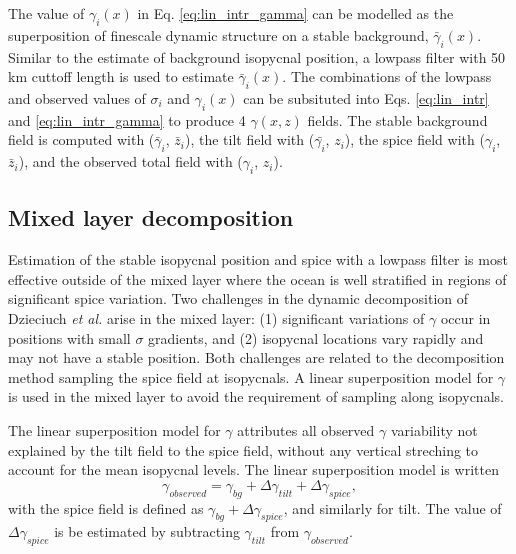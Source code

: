 \documentclass[preprint,NumberedRefs]{JASA}
\begin{document}
The value of $\gamma_i(x)$ in Eq. \eqref{eq:lin_intr_gamma} can be modelled as the superposition of finescale dynamic structure on a stable background, $\bar{\gamma}_i(x)$. Similar to the estimate of background isopycnal position, a lowpass filter with 50 km cuttoff length is used to estimate $\bar{\gamma}_i(x)$. The combinations of the lowpass and observed values of $\sigma_i$ and $\gamma_i(x)$ can be subsituted into Eqs. \eqref{eq:lin_intr} and \eqref{eq:lin_intr_gamma} to produce 4 $\gamma(x,z)$ fields. The stable background field is computed with ($\bar{\gamma}_i$, $\bar{z}_i$), the tilt field with ($\bar{\gamma_i}$, $z_i$), the spice field with ($\gamma_i$, $\bar{z}_i$), and the observed total field with ($\gamma_i$, $z_i$).


\subsection{Mixed layer decomposition}
Estimation of the stable isopycnal position and spice with a lowpass filter is most effective outside of the mixed layer where the ocean is well stratified in regions of significant spice variation. Two challenges in the dynamic decomposition of Dzieciuch \emph{et al.}\citep{dzieciuch2004} arise in the mixed layer: (1) significant variations of $\gamma$ occur in positions with small $\sigma$ gradients, and (2) isopycnal locations vary rapidly and may not have a stable position. Both challenges are related to the decomposition method sampling the spice field at isopycnals. A linear superposition model for $\gamma$ is used in the mixed layer to avoid the requirement of sampling along isopycnals.

The linear superposition model for $\gamma$ attributes all observed $\gamma$ variability not explained by the tilt field to the spice field, without any vertical streching to account for the mean isopycnal levels. The linear superposition model is written
\begin{equation}
    \gamma_{observed} = \gamma_{bg} + \Delta \gamma_{tilt} + \Delta \gamma_{spice},
\end{equation}
with the spice field is defined as $\gamma_{bg} + \Delta \gamma_{spice}$, and similarly for tilt. The value of $\Delta \gamma_{spice}$ is be estimated by subtracting $\gamma_{tilt}$ from $\gamma_{observed}$.
\end{document}

